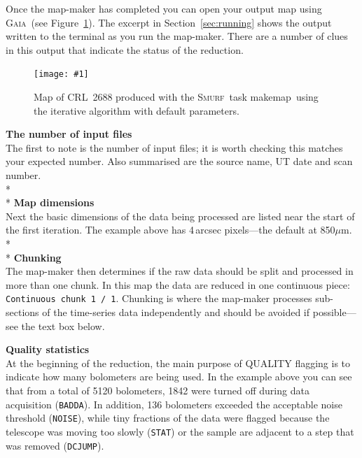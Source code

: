\documentclass[twoside,11pt]{article}
\newcommand{\htmladdimg}[1]{}
\newcommand{\htmlref}[2]{#1}
\newenvironment{latexonly}{}{}
\newcommand{\html}[1]{}
\newcommand{\latexhtml}[2]{#1}
\newcommand{\xref}[3]{#1}
\renewcommand{\_}{\texttt{\symbol{95}}}
\newcommand{\gaia}{\xref{\textsc{Gaia}}{sun214}{}}
\newcommand{\smurf}{\xref{\textsc{Smurf}}{sun258}{}}
\newcommand{\task}[1]{\textsf{#1}}
\newcommand{\param}[1]{\texttt{#1}}
\newcommand{\makemap}{\xref{\task{makemap}}{sun258}{MAKEMAP}}
\newcommand{\myfig}[6]{
  \begin{figure}#2
    \centering\texttt{[image: \#1]}
    \typeout{#1 inserted on page \arabic{page}}
    \caption[#5]{\label{#4}\small #6}
  \end{figure}
}
\newcommand{\myfig}[6]{
    \label{#4} \htmladdimg{#1.png}\\
    \\
    Figure: #6\\
  }
\newcommand{\cref}[3]{\latexhtml{#1~\ref{#2}}{\htmlref{#3}{#2}}}
\begin{document}
Once the map-maker has completed you can open your output map using
\gaia\ (see \cref{Figure}{fig:itermap}{this example}). The excerpt
in \cref{Section}{sec:running}{Running the iterative map-maker} shows
the output written to the terminal as you run the map-maker. There are
a number of clues in this output that indicate the status of the
reduction.
\begin{latexonly}
\myfig{sc21_crl2688}{[t!]}{width=0.7\linewidth}{fig:itermap}{
  CRL~2688 produced with \makemap}{
  Map of CRL~2688 produced with the \smurf\ task \makemap\ using the
  iterative algorithm with default parameters.
}
\end{latexonly}
\newline\newline
\textbf{The number of input files}\\
The first to note is the number of input files; it is worth checking
this matches your expected number. Also summarised are the source
name, UT date and scan number.
\\*\\*
\textbf{Map dimensions}\\
Next the basic dimensions of the data being processed are listed near
the start of the first iteration. The example above has 4\,arcsec
pixels---the default at 850$\mu$m.
\\*\\*
\textbf{Chunking}\label{box:chunk}\\
The map-maker then determines if the raw data should be split and
processed in more than one chunk. In this map the data are reduced in
one continuous piece: \param{Continuous chunk 1 / 1}. Chunking is
where the map-maker processes sub-sections of the time-series data
independently and should be avoided if possible---see the text box
below.
\html{\newline}

\begin{htmlonly}
\htmladdimg{sc21_data_chunking.png}
\newline\newline
\end{htmlonly}

\textbf{Quality statistics}\\
At the beginning of the reduction, the main purpose of QUALITY
flagging is to indicate how many bolometers are being used. In the
example above you can see that from a total of 5120 bolometers, 1842
were turned off during data acquisition (\texttt{BADDA}). In addition,
136 bolometers
exceeded the acceptable noise threshold (\texttt{NOISE}), while tiny
fractions of the data were flagged because the telescope was moving
too slowly (\texttt{STAT}) or the sample are adjacent to a step that
was removed (\texttt{DCJUMP}).
\end{document}
